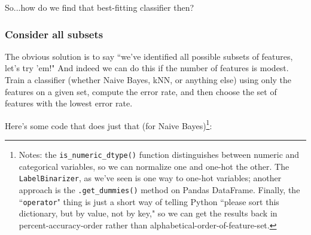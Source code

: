 \documentclass[12pt]{article}
\begin{document}
So...how do we find that best-fitting classifier then?

\subsubsection{Consider all subsets}

The obvious solution is to say ``we've identified all possible subsets of
features, let's try 'em!" And indeed we can do this if the number of features
is modest. Train a classifier (whether Naive Bayes, kNN, or anything else)
using only the features on a given set, compute the error rate, and then
choose the set of features with the lowest error rate.

Here's some code that does just that (for Naive Bayes)\footnote{Notes: the
\texttt{is\_numeric\_dtype()} function distinguishes between numeric and
categorical variables, so we can normalize one and one-hot the other. The
\texttt{LabelBinarizer}, as we've seen is one way to one-hot variables;
another approach is the \texttt{.get\_dummies()} method on Pandas DataFrame.
Finally, the ``\texttt{operator}" thing is just a short way of telling Python
``please sort this dictionary, but by value, not by key," so we can get the
results back in percent-accuracy-order rather than
alphabetical-order-of-feature-set.}:
\end{document}
